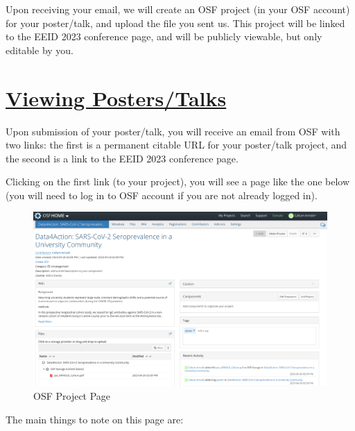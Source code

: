 \documentclass{scrartcl}
\begin{document}
Upon receiving your email, we will create an OSF project (in your OSF account) for your poster/talk, and upload the file you sent us.
This project will be linked to the EEID 2023 conference page, and will be publicly viewable, but only editable by you.

\section{\underline{Viewing Posters/Talks}}

Upon submission of your poster/talk, you will receive an email from OSF with two links: the first is a permanent citable URL for your poster/talk project, and the second is a link to the EEID 2023 conference page.

Clicking on the first link (to your project), you will see a page like the one below (you will need to log in to OSF account if you are not already logged in).

\begin{figure}[!htb]
    \includegraphics[width=\textwidth]{project-page-01.png}
    \caption{OSF Project Page}
\end{figure}

The main things to note on this page are:
\end{document}
